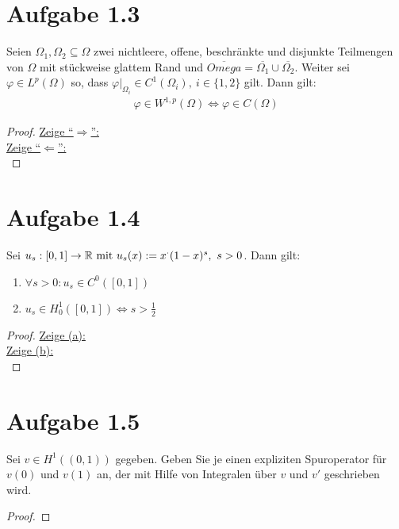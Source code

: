 \documentclass[12pt,a4paper]{article}
\begin{document}
\section*{Aufgabe 1.3}
Seien $\Omega_1,\Omega_2\subseteq\Omega$ zwei nichtleere, offene, beschränkte und disjunkte Teilmengen von $\Omega$ mit stückweise glattem Rand und $\overline{Omega}=\overline{\Omega_1}\cup\overline{\Omega_2}$. Weiter sei $\varphi\in L^p(\Omega)$ so, dass $\varphi|_{\Omega_i}\in C^1(\Omega_i),~i\in\lbrace1,2\rbrace$ gilt. Dann gilt:
\begin{align*}
\varphi\in W^{1,p}(\Omega)\Longleftrightarrow\varphi\in C(\Omega)
\end{align*}
\begin{proof}
\underline{Zeige ``$\Rightarrow$'':}\\

\underline{Zeige ``$\Leftarrow$'':}\\

\end{proof}

\section*{Aufgabe 1.4}
Sei $u_s:[0,1]\to\mathbb{R}\text{ mit } u_s(x):=x^\cdot(1-x)^s,~s>0$. Dann gilt:
\begin{enumerate}[label=(\alph*)]
\item $\forall s>0:u_s\in C^0([0,1])$
\item $u_s\in H_0^1([0,1])\Longleftrightarrow s>\frac{1}{2}$
\end{enumerate}
\begin{proof}
\underline{Zeige (a):}\\

\underline{Zeige (b):}\\


\end{proof}

\section*{Aufgabe 1.5}
Sei $v\in H^1((0,1))$ gegeben. Geben Sie je einen expliziten Spuroperator für $v(0)$ und $v(1)$ an, der mit Hilfe von Integralen über $v$ und $v'$ geschrieben wird.

\begin{proof}

\end{proof}
\end{document}
